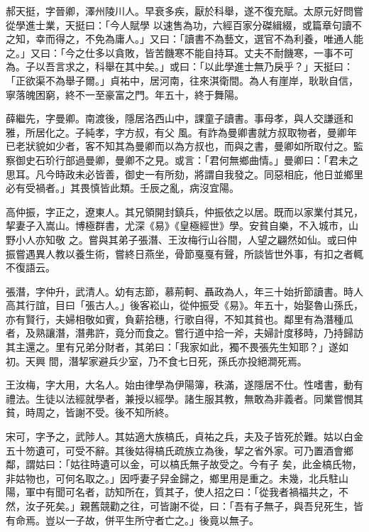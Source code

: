 \begin{pinyinscope}
 郝天挺，字晉卿，澤州陵川人。早衰多疾，厭於科舉，遂不復充賦。太原元好問嘗從學進士業，天挺曰：「今人賦學
 以速售為功，六經百家分磔緝綴，或篇章句讀不之知，幸而得之，不免為庸人。」又曰：「讀書不為藝文，選官不為利養，唯通人能之。」又曰：「今之仕多以貪敗，皆苦饑寒不能自持耳。丈夫不耐饑寒，一事不可為。子以吾言求之，科舉在其中矣。」或曰：「以此學進士無乃戾乎？」天挺曰：「正欲渠不為舉子爾。」貞祐中，居河南，往來淇衛間。為人有崖岸，耿耿自信，寧落魄困窮，終不一至豪富之門。年五十，終于舞陽。



 薛繼先，字曼卿。南渡後，隱居洛西山中，課童子讀書。事母孝，與人交謙遜和雅，所居化之。子純孝，字方叔，有父
 風。有詐為曼卿書就方叔取物者，曼卿年已老狀貌如少者，客不知其為曼卿而以為方叔也，而與之書，曼卿如所取付之。監察御史石玠行部過曼卿，曼卿不之見。或言：「君何無鄉曲情。」曼卿曰：「君未之思耳。凡今時政未必皆善，御史一有所劾，將謂自我發之。同惡相庇，他日並鄉里必有受禍者。」其畏慎皆此類。壬辰之亂，病沒宜陽。



 高仲振，字正之，遼東人。其兄領開封鎮兵，仲振依之以居。既而以家業付其兄，挈妻子入嵩山。博極群書，尤深《易》《皇極經世》學。安貧自樂，不入城市，山野小人亦知敬
 之。嘗與其弟子張潛、王汝梅行山谷間，人望之翩然如仙。或曰仲振嘗遇異人教以養生術，嘗終日燕坐，骨節戛戛有聲，所談皆世外事，有扣之者輒不復語云。



 張潛，字仲升，武清人。幼有志節，慕荊軻、聶政為人，年三十始折節讀書。時人高其行誼，目曰「張古人。」後客崧山，從仲振受《易》。年五十，始娶魯山孫氏，亦有賢行，夫婦相敬如賓，負薪拾穗，行歌自得，不知其貧也。鄰里有為潛種瓜者，及熟讓潛，潛弗許，竟分而食之。嘗行道中拾一斧，夫婦計度移時，乃持歸訪其主還之。里有兄弟分財者，其弟曰：「我家如此，獨不畏張先生知耶？」遂如初。天興
 間，潛挈家避兵少室，乃不食七日死，孫氏亦投絕澗死焉。



 王汝梅，字大用，大名人。始由律學為伊陽簿，秩滿，遂隱居不仕。性嗜書，動有禮法。生徒以法經就學者，兼授以經學。諸生服其教，無敢為非義者。同業嘗憫其貧，時周之，皆謝不受。後不知所終。



 宋可，字予之，武陟人。其姑適大族槁氏，貞祐之兵，夫及子皆死於難。姑以白金五十笏遺可，可受不辭。其後姑得槁氏疏族立為後，挈之省外家。可乃置酒會鄉鄰，謂姑曰：「姑往時遺可以金，可以槁氏無子故受之。今有子
 矣，此金槁氏物，非姑物也，可何名取之。」因呼妻子舁金歸之，鄉里用是重之。未幾，北兵駐山陽，軍中有聞可名者，訪知所在，質其子，使人招之曰：「從我者禍福共之，不然，汝子死矣。」親舊競勸之往，可皆謝不從，曰：「吾有子無子，與吾兒死生，皆有命焉。豈以一子故，併平生所守者亡之。」後竟以無子。




\end{pinyinscope}
